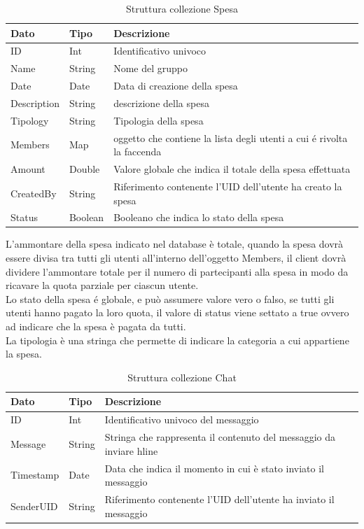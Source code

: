 \begin{table}[h]
\begin{center}
\begin{tabular}{|l|l|p{10cm}|}
    \hline
\textbf{Dato} & \textbf{Tipo}  & \textbf{Descrizione}\\ \hline
ID & Int & Identificativo univoco \\ \hline
Name & String & Nome del gruppo \\ \hline
Date & Date & Data di creazione della spesa \\ \hline
Description & String & descrizione della spesa \\ \hline
Tipology & String & Tipologia della spesa \\ \hline
Members & Map & oggetto che contiene la lista degli utenti a cui \'e rivolta la faccenda \\ \hline
Amount & Double & Valore globale che indica il totale della spesa effettuata \\ \hline
CreatedBy & String &  Riferimento contenente l'UID dell'utente ha creato la spesa \\ \hline
Status & Boolean & Booleano che indica lo stato della spesa\\
\hline
\end{tabular}
\caption[Collezione Spesa]{Struttura collezione Spesa}\label{tab:Strutture collezzione Spesa}
\end{center}
\end{table}

L'ammontare della spesa indicato nel database è totale, quando la spesa dovrà essere divisa tra tutti gli utenti all'interno dell'oggetto Members, il client dovrà dividere l'ammontare totale per il numero di partecipanti alla spesa in modo da ricavare la quota parziale per ciascun utente.\\

Lo stato della spesa \'e globale, e può assumere valore vero o falso, se tutti gli utenti hanno pagato la loro quota, il valore di status viene settato a true ovvero ad indicare che la spesa è pagata da tutti.\\
La tipologia è una stringa che permette di indicare la categoria a cui appartiene la spesa.


\begin{table}[h]
\begin{center}
\begin{tabular}{|l|l|p{10cm}|}
    \hline
\textbf{Dato} & \textbf{Tipo}  & \textbf{Descrizione}\\ \hline
ID & Int & Identificativo univoco del messaggio\\ \hline
Message & String & Stringa che rappresenta il contenuto del messaggio da inviare hline\\ \hline
Timestamp & Date & Data che indica il momento in cui è stato inviato il messaggio\\ \hline
SenderUID & String & Riferimento contenente l'UID dell'utente ha inviato il messaggio \\
\hline
\end{tabular}
\caption[Collezione Chat]{Struttura collezione Chat}\label{tab:Strutture collezzione Chat}
\end{center}
\end{table}

